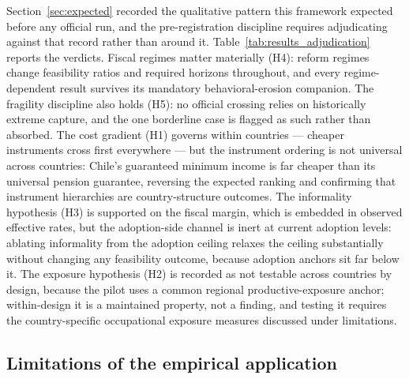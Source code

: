 \documentclass[11pt,a4paper]{article}
\begin{document}
Section~\ref{sec:expected} recorded the qualitative pattern this framework expected before
any official run, and the pre-registration discipline requires adjudicating against that
record rather than around it. Table~\ref{tab:results_adjudication} reports the verdicts.
Fiscal regimes matter materially (H4): reform regimes change
feasibility ratios and required horizons throughout, and every regime-dependent result
survives its mandatory behavioral-erosion companion. The fragility discipline also holds
(H5): no official crossing relies on historically extreme capture, and the one borderline
case is flagged as such rather than absorbed. The cost gradient (H1) governs within countries --- cheaper
instruments cross first everywhere --- but the instrument ordering is not universal across
countries: Chile's guaranteed minimum income is far cheaper than its universal pension
guarantee, reversing the expected ranking and confirming that instrument hierarchies are
country-structure outcomes. The informality hypothesis (H3) is supported on the fiscal
margin, which is embedded in observed effective rates, but the adoption-side channel is
inert at current adoption levels: ablating informality from the adoption ceiling relaxes
the ceiling substantially without changing any feasibility outcome, because adoption
anchors sit far below it. The exposure hypothesis (H2) is recorded as not testable
across countries by design, because the pilot uses a common regional productive-exposure
anchor; within-design it is a maintained property, not a finding, and testing it requires
the country-specific occupational exposure measures discussed under limitations.



\subsection{Limitations of the empirical application}\label{subsec:results_limitations}
\end{document}
